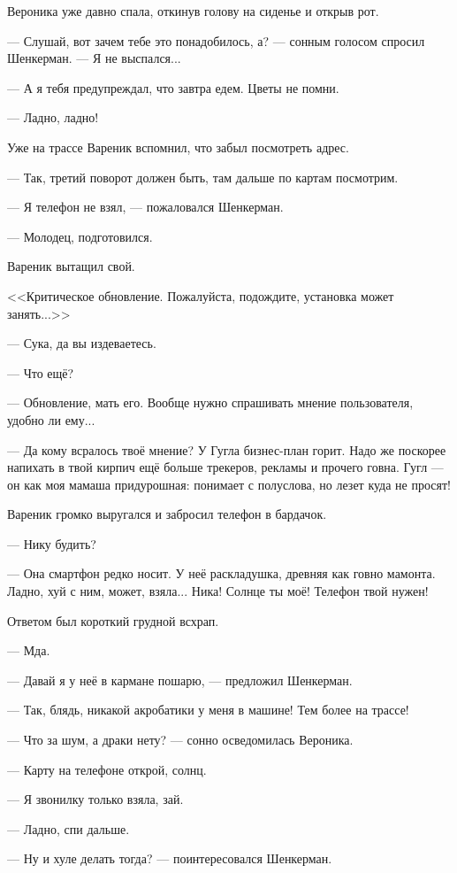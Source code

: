 \documentclass[a4paper,10pt,fleqn]{book}\usepackage{polyglossia}\setdefaultlanguage{english}\setotherlanguage{russian}\defaultfontfeatures{Ligatures=TeX,Mapping=tex-text} \usepackage{xcolor}\definecolor{lightgray}{HTML}{bbbbbb}\color{lightgray}\newcommand{\ml}[3]{\textcolor{black}{#3}}
\begin{document}
Вероника уже давно спала, откинув голову на сиденье и открыв рот.

--- Слушай, вот зачем тебе это понадобилось, а? --- сонным голосом спросил Шенкерман.
--- Я не выспался...

--- А я тебя предупреждал, что завтра едем.
Цветы не помни.

--- Ладно, ладно!

Уже на трассе Вареник вспомнил, что забыл посмотреть адрес.

--- Так, третий поворот должен быть, там дальше по картам посмотрим.

--- Я телефон не взял, --- пожаловался Шенкерман.

--- Молодец, подготовился.

Вареник вытащил свой.

<<Критическое обновление.
Пожалуйста, подождите, установка может занять...>>

--- Сука, да вы издеваетесь.

--- Что ещё?

--- Обновление, мать его.
Вообще нужно спрашивать мнение пользователя, удобно ли ему...

--- Да кому всралось твоё мнение?
У Гугла бизнес-план горит.
Надо же поскорее напихать в твой кирпич ещё больше трекеров, рекламы и прочего говна.
Гугл --- он как моя мамаша придурошная: понимает с полуслова, но лезет куда не просят!

Вареник громко выругался и забросил телефон в бардачок.

--- Нику будить?

--- Она смартфон редко носит.
У неё раскладушка, древняя как говно мамонта.
Ладно, хуй с ним, может, взяла...
Ника!
Солнце ты моё!
Телефон твой нужен!

Ответом был короткий грудной всхрап.

--- Мда.

--- Давай я у неё в кармане пошарю, --- предложил Шенкерман.

--- Так, блядь, никакой акробатики у меня в машине!
Тем более на трассе!

--- Что за шум, а драки нету? --- сонно осведомилась Вероника.

--- Карту на телефоне открой, солнц.

--- Я звонилку только взяла, зай.

--- Ладно, спи дальше.

--- Ну и хуле делать тогда? --- поинтересовался Шенкерман.
\end{document}
